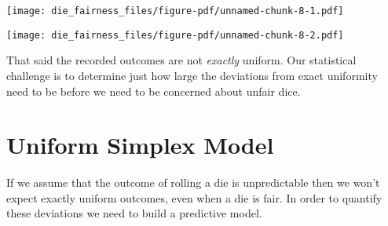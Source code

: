 \documentclass[
  letterpaper,
  DIV=11,
  numbers=noendperiod]{scrartcl}
\newenvironment{Shaded}{\begin{snugshade}}{\end{snugshade}}
\newcommand{\AttributeTok}[1]{\textcolor[rgb]{0.40,0.45,0.13}{#1}}
\newcommand{\ControlFlowTok}[1]{\textcolor[rgb]{0.00,0.23,0.31}{#1}}
\newcommand{\DecValTok}[1]{\textcolor[rgb]{0.68,0.00,0.00}{#1}}
\newcommand{\FloatTok}[1]{\textcolor[rgb]{0.68,0.00,0.00}{#1}}
\newcommand{\FunctionTok}[1]{\textcolor[rgb]{0.28,0.35,0.67}{#1}}
\newcommand{\NormalTok}[1]{\textcolor[rgb]{0.00,0.23,0.31}{#1}}
\newcommand{\SpecialCharTok}[1]{\textcolor[rgb]{0.37,0.37,0.37}{#1}}
\newcommand{\StringTok}[1]{\textcolor[rgb]{0.13,0.47,0.30}{#1}}
\begin{document}
\begin{Shaded}
\end{Shaded}

\texttt{[image: die\_fairness\_files/figure-pdf/unnamed-chunk-8-1.pdf]}

\texttt{[image: die\_fairness\_files/figure-pdf/unnamed-chunk-8-2.pdf]}

That said the recorded outcomes are not \emph{exactly} uniform. Our
statistical challenge is to determine just how large the deviations from
exact uniformity need to be before we need to be concerned about unfair
dice.

\section{Uniform Simplex Model}\label{uniform-simplex-model}

If we assume that the outcome of rolling a die is unpredictable then we
won't expect exactly uniform outcomes, even when a die is fair. In order
to quantify these deviations we need to build a predictive model.
\end{document}
